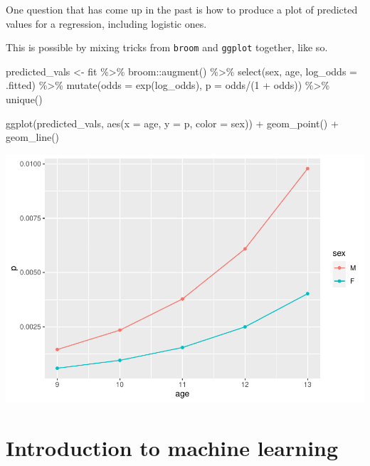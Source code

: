 \documentclass[
]{book}
\newenvironment{Shaded}{\begin{snugshade}}{\end{snugshade}}
\newcommand{\AttributeTok}[1]{\textcolor[rgb]{0.77,0.63,0.00}{#1}}
\newcommand{\DecValTok}[1]{\textcolor[rgb]{0.00,0.00,0.81}{#1}}
\newcommand{\FunctionTok}[1]{\textcolor[rgb]{0.00,0.00,0.00}{#1}}
\newcommand{\NormalTok}[1]{#1}
\newcommand{\OtherTok}[1]{\textcolor[rgb]{0.56,0.35,0.01}{#1}}
\newcommand{\SpecialCharTok}[1]{\textcolor[rgb]{0.00,0.00,0.00}{#1}}
\begin{document}
One question that has come up in the past is how to produce a plot of predicted values for a regression, including logistic ones.

This is possible by mixing tricks from \texttt{broom} and \texttt{ggplot} together, like so.

\begin{Shaded}
\begin{Highlighting}[]
\NormalTok{predicted\_vals }\OtherTok{\textless{}{-}}\NormalTok{ fit }\SpecialCharTok{\%\textgreater{}\%}
\NormalTok{  broom}\SpecialCharTok{::}\FunctionTok{augment}\NormalTok{() }\SpecialCharTok{\%\textgreater{}\%} 
  \FunctionTok{select}\NormalTok{(sex, age, }\AttributeTok{log\_odds =}\NormalTok{ .fitted) }\SpecialCharTok{\%\textgreater{}\%} 
  \FunctionTok{mutate}\NormalTok{(}\AttributeTok{odds =} \FunctionTok{exp}\NormalTok{(log\_odds), }\AttributeTok{p =}\NormalTok{ odds}\SpecialCharTok{/}\NormalTok{(}\DecValTok{1} \SpecialCharTok{+}\NormalTok{ odds)) }\SpecialCharTok{\%\textgreater{}\%} 
  \FunctionTok{unique}\NormalTok{() }

\FunctionTok{ggplot}\NormalTok{(predicted\_vals, }\FunctionTok{aes}\NormalTok{(}\AttributeTok{x =}\NormalTok{ age, }\AttributeTok{y =}\NormalTok{ p, }\AttributeTok{color =}\NormalTok{ sex)) }\SpecialCharTok{+}
  \FunctionTok{geom\_point}\NormalTok{() }\SpecialCharTok{+}
  \FunctionTok{geom\_line}\NormalTok{()}
\end{Highlighting}
\end{Shaded}

\includegraphics{_main_files/figure-latex/unnamed-chunk-132-1.pdf}

\hypertarget{introduction-to-machine-learning}{%
\chapter{Introduction to machine learning}\label{introduction-to-machine-learning}}
\end{document}
